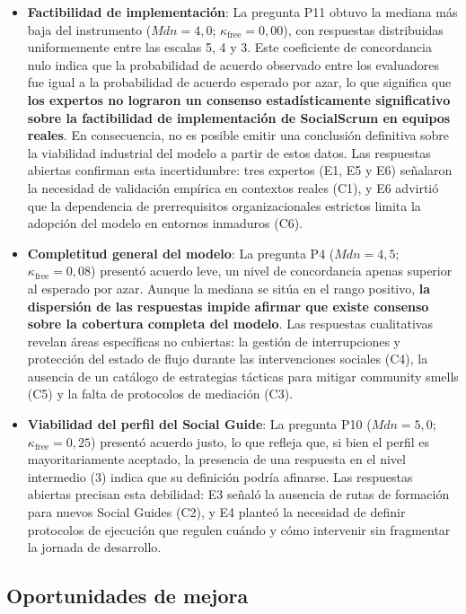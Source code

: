 \begin{itemize}
    \item \textbf{Factibilidad de implementación}: La pregunta P11 obtuvo la mediana más baja del instrumento ($Mdn = 4{,}0$; $\kappa_{\text{free}} = 0{,}00$), con respuestas distribuidas uniformemente entre las escalas 5, 4 y 3. Este coeficiente de concordancia nulo indica que la probabilidad de acuerdo observado entre los evaluadores fue igual a la probabilidad de acuerdo esperado por azar, lo que significa que \textbf{los expertos no lograron un consenso estadísticamente significativo sobre la factibilidad de implementación de SocialScrum en equipos reales}. En consecuencia, no es posible emitir una conclusión definitiva sobre la viabilidad industrial del modelo a partir de estos datos. Las respuestas abiertas confirman esta incertidumbre: tres expertos (E1, E5 y E6) señalaron la necesidad de validación empírica en contextos reales (C1), y E6 advirtió que la dependencia de prerrequisitos organizacionales estrictos limita la adopción del modelo en entornos inmaduros (C6).
    \item \textbf{Completitud general del modelo}: La pregunta P4 ($Mdn = 4{,}5$; $\kappa_{\text{free}} = 0{,}08$) presentó acuerdo leve, un nivel de concordancia apenas superior al esperado por azar. Aunque la mediana se sitúa en el rango positivo, \textbf{la dispersión de las respuestas impide afirmar que existe consenso sobre la cobertura completa del modelo}. Las respuestas cualitativas revelan áreas específicas no cubiertas: la gestión de interrupciones y protección del estado de flujo durante las intervenciones sociales (C4), la ausencia de un catálogo de estrategias tácticas para mitigar community smells (C5) y la falta de protocolos de mediación (C3).
    \item \textbf{Viabilidad del perfil del Social Guide}: La pregunta P10 ($Mdn = 5{,}0$; $\kappa_{\text{free}} = 0{,}25$) presentó acuerdo justo, lo que refleja que, si bien el perfil es mayoritariamente aceptado, la presencia de una respuesta en el nivel intermedio (3) indica que su definición podría afinarse. Las respuestas abiertas precisan esta debilidad: E3 señaló la ausencia de rutas de formación para nuevos Social Guides (C2), y E4 planteó la necesidad de definir protocolos de ejecución que regulen cuándo y cómo intervenir sin fragmentar la jornada de desarrollo.
\end{itemize}

\subsection{Oportunidades de mejora}

